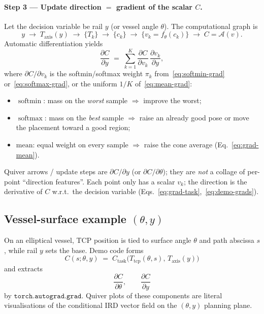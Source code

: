 \documentclass[11pt,a4paper]{article}
\newcommand{\Tcp}{T_{\mathrm{tcp}}}
\newcommand{\Taxis}{T_{\mathrm{axis}}}
\newcommand{\softmin}{\operatorname{softmin}}
\newcommand{\softmax}{\operatorname{softmax}}
\begin{document}
\paragraph{Step 3 --- Update direction $=$ gradient of the scalar $C$.}
Let the decision variable be rail \(y\) (or vessel angle \(\theta\)). The
computational graph is
\begin{equation}
\label{eq:opt-chain}
  y
  \;\to\;
  \Taxis(y)
  \;\to\;
  \{T_{k}\}
  \;\to\;
  \{c_{k}\}
  \;\to\;
  \{v_{k}=f_{\theta}(c_{k})\}
  \;\to\;
  C=\mathcal{A}(v).
\end{equation}
Automatic differentiation yields
\begin{equation}
\label{eq:opt-grad-y}
  \frac{\partial C}{\partial y}
  \;=\;
  \sum_{k=1}^{K}
  \frac{\partial C}{\partial v_{k}}\,
  \frac{\partial v_{k}}{\partial y},
\end{equation}
where \(\partial C/\partial v_{k}\) is the softmin/softmax weight \(\pi_{k}\)
from~\eqref{eq:softmin-grad} or~\eqref{eq:softmax-grad}, or the uniform
\(1/K\) of~\eqref{eq:mean-grad}:
\begin{itemize}[leftmargin=1.4em]
  \item \(\softmin\): mass on the \emph{worst} sample \(\Rightarrow\) improve the worst;
  \item \(\softmax\): mass on the \emph{best} sample \(\Rightarrow\) raise an already
        good pose or move the placement toward a good region;
  \item \(\mathrm{mean}\): equal weight on every sample \(\Rightarrow\) raise the
        cone average (Eq.~\eqref{eq:grad-mean}).
\end{itemize}
Quiver arrows / update steps are \(\partial C/\partial y\) (or
\(\partial C/\partial\theta\)); they are \emph{not} a collage of per-point
``direction features''. Each point only has a scalar \(v_{k}\); the direction
is the derivative of \(C\) w.r.t.\ the decision variable
(Eqs.~\eqref{eq:grad-task},~\eqref{eq:demo-grads}).

\subsection{Vessel-surface example \((\theta,y)\)}
\label{sec:vessel-grad}

On an elliptical vessel, TCP position is tied to surface angle \(\theta\) and
path abscissa \(s\), while rail \(y\) sets the base. Demo code forms
\begin{equation}
\label{eq:demo-query}
  C(s;\theta,y)
  \;=\;
  C_{\mathrm{task}}\bigl(
    \Tcp(\theta,s),\,
    \Taxis(y)
  \bigr)
\end{equation}
and extracts
\begin{equation}
\label{eq:demo-grads}
  \frac{\partial C}{\partial\theta},
  \qquad
  \frac{\partial C}{\partial y}
\end{equation}
by \(\mathtt{torch.autograd.grad}\). Quiver plots of these components are
literal visualisations of the conditional IRD vector field on the
\((\theta,y)\) planning plane.
\end{document}
